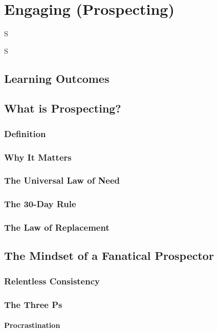\frenchspacing
\chapter{Engaging (Prospecting)}
\epigraph{S}{S}

%
\section{Learning Outcomes}\mbox{}

\section{What is Prospecting?}\mbox{}
    \subsection{Definition}\mbox{}
    \subsection{Why It Matters}\mbox{}
    \subsection{The Universal Law of Need}\mbox{}
    \subsection{The 30-Day Rule}\mbox{}
    \subsection{The Law of Replacement}\mbox{}

\section{The Mindset of a Fanatical Prospector}\mbox{}
    \subsection{Relentless Consistency}\mbox{}
    \subsection{The Three Ps}\mbox{}
        \subsubsection{Procrastination}\mbox{}
